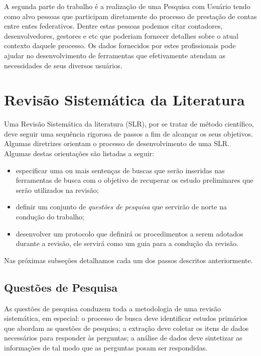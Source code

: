 \documentclass{article}
\begin{document}
A segunda parte do trabalho é a realização de uma Pesquisa com Usuário
tendo como alvo pessoas que participam diretamente do processo de prestação de contas
entre entes federativos. Dentre estas pessoas podemos citar
contadores, desenvolvedores, gestores e etc que poderiam fornecer
detalhes sobre o atual contexto daquele processo. Os dados fornecidos
por estes profissionais pode ajudar no desenvolvimento de
ferramentas que efetivamente atendam as necessidades de seus diversos usuários.

\section{Revisão Sistemática da Literatura}
\label{sec:rsl}

Uma Revisão Sistemática da literatura (SLR), por se tratar de método
científico, deve seguir uma sequência rigorosa de passos a fim de
alcançar os seus objetivos. Algumas diretrizes orientam o processo de desenvolvimento de uma
SLR\cite{keele2007guidelines}. Algumas destas orientações são listadas
a seguir:
\begin{itemize}
  \item especificar uma ou mais sentenças de buscas que serão
    inseridas nas ferramentas de busca com o objetivo de recuperar os
    estudo preliminares que serão utilizados na revisão;
  \item definir um conjunto de \textit{questões de pesquisa} que
    servirão de norte na condução do trabalho;
 \item  desenvolver um protocolo que definirá os procedimentos a serem adotados durante a revisão, ele servirá como um guia para a condução da revisão. 
\end{itemize}

Nas próximas subseções detalhamos cada um dos passos descritos anteriormente.

\subsection{Questões de Pesquisa}
\label{subsec:research_question}

As questões de pesquisa conduzem toda a metodologia
de uma revisão sistemática, em especial: o processo de busca deve identificar estudos
primários que abordam as questões de pesquisa; a extração
deve coletar os itens de dados necessários para responder às
perguntas; a análise de dados deve sintetizar as
informações de tal modo que as perguntas posam ser respondidas. 
\end{document}
